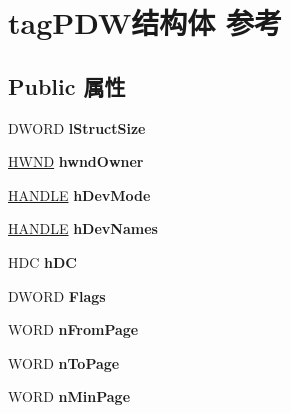 \hypertarget{structtag_p_d_w}{}\section{tag\+P\+D\+W结构体 参考}
\label{structtag_p_d_w}
\subsection*{Public 属性}
\begin{DoxyCompactItemize}
\item 
\mbox{\label{structtag_p_d_w_ab6e0f8bdbb05547047fadc8bb06412d4}} 
D\+W\+O\+RD {\bfseries l\+Struct\+Size}
\item 
\mbox{\label{structtag_p_d_w_a5131a29170c2c6ea9d1f46d6b910e393}} 
\hyperlink{interfacevoid}{H\+W\+ND} {\bfseries hwnd\+Owner}
\item 
\mbox{\label{structtag_p_d_w_ab60f2f075377fd738c95186348c523d1}} 
\hyperlink{interfacevoid}{H\+A\+N\+D\+LE} {\bfseries h\+Dev\+Mode}
\item 
\mbox{\label{structtag_p_d_w_ae447667f77c9a0fe83449dcf3f5f0c14}} 
\hyperlink{interfacevoid}{H\+A\+N\+D\+LE} {\bfseries h\+Dev\+Names}
\item 
\mbox{\label{structtag_p_d_w_aaae645e9ef77c32d18976c29d1644195}} 
H\+DC {\bfseries h\+DC}
\item 
\mbox{\label{structtag_p_d_w_a4834ecb18403401f2dba66e0c47586f8}} 
D\+W\+O\+RD {\bfseries Flags}
\item 
\mbox{\label{structtag_p_d_w_af81a561bf87b01f452459a94a7bbd5c5}} 
W\+O\+RD {\bfseries n\+From\+Page}
\item 
\mbox{\label{structtag_p_d_w_a7d8ae55b397be2c490e46b4f47bb057b}} 
W\+O\+RD {\bfseries n\+To\+Page}
\item 
\mbox{\label{structtag_p_d_w_a9807e61955a98e642aa801a680ed7dc5}} 
W\+O\+RD {\bfseries n\+Min\+Page}
\item 
\mbox{\label{structtag_p_d_w_a930d56c4b29929369b120200f0dceeb0}} 

\end{DoxyCompactItemize}
